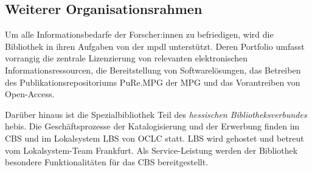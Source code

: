 \subsection{Weiterer Organisationsrahmen}
Um alle Informationsbedarfe der Forscher:innen zu befriedigen, wird die Bibliothek in ihren Aufgaben von der
\acrfull{mpdl} unterstützt. Deren Portfolio umfasst vorrangig die zentrale 
Lizenzierung von relevanten elektronischen Informationsressourcen, die Bereitstellung von Softwarelösungen, 
das Betreiben des Publikationsrepositoriums \acrshort{PuRe.MPG} der \acrfull{MPG} und
das Vorantreiben von Open-Access. 

Darüber hinaus ist die Spezialbibliothek Teil des \textit{hessischen Bibliotheksverbundes} \acrshort{hebis}. 
Die Geschäftsprozesse der Katalogisierung und der Erwerbung finden im \acrfull{CBS} und 
im Lokalsystem \acrfull{LBS} von \acrfull{OCLC} statt. \acrshort{LBS} wird gehostet und betreut vom Lokalsystem-Team Frankfurt. 
Als Service-Leistung werden der Bibliothek besondere Funktionalitäten für das \acrlong{CBS} bereitgestellt.


